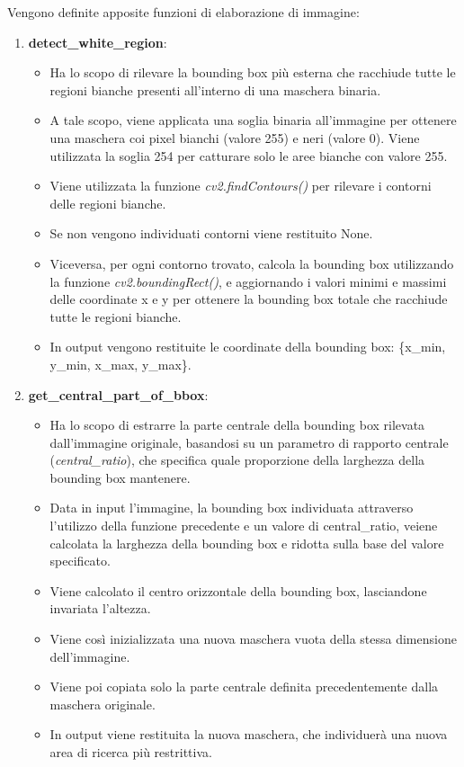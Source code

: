 \documentclass[12pt,a4paper,openright,twoside]{book}
\begin{document}
Vengono definite apposite funzioni di elaborazione di immagine:
\begin{enumerate}
\item \textbf{detect\_white\_region}:
\begin{itemize}
\item Ha lo scopo di rilevare la bounding box più esterna che racchiude tutte le regioni bianche presenti all'interno di una maschera binaria.
\item A tale scopo, viene applicata una soglia binaria all'immagine per ottenere una maschera coi pixel bianchi (valore 255) e neri (valore 0). Viene utilizzata la soglia 254 per catturare solo le aree bianche con valore 255.
\item Viene utilizzata la funzione {\itshape cv2.findContours()} per rilevare i contorni delle regioni bianche.
\item Se non vengono individuati contorni viene restituito None.
\item Viceversa, per ogni contorno trovato, calcola la bounding box utilizzando la funzione {\itshape cv2.boundingRect()}, e aggiornando i valori minimi e massimi delle coordinate x e y per ottenere la bounding box totale che racchiude tutte le regioni bianche.
\item In output vengono restituite le coordinate della bounding box: \{x\_min, y\_min, x\_max, y\_max\}.
\end{itemize}

\item \textbf{get\_central\_part\_of\_bbox}:
\begin{itemize}
\item Ha lo scopo di estrarre la parte centrale della bounding box rilevata dall'immagine originale, basandosi su un parametro di rapporto centrale ({\itshape central\_ratio}), che specifica quale proporzione della larghezza della bounding box mantenere.
\item Data in input l'immagine, la bounding box individuata attraverso l'utilizzo della funzione precedente e un valore di central\_ratio, veiene calcolata la larghezza della bounding box e ridotta sulla base del valore specificato. 
\item Viene calcolato il centro orizzontale della bounding box, lasciandone invariata l'altezza.
\item Viene così inizializzata una nuova maschera vuota della stessa dimensione dell'immagine.
\item Viene poi copiata solo la parte centrale definita precedentemente dalla maschera originale.
\item In output viene restituita la nuova maschera, che individuerà una nuova area di ricerca più restrittiva.
\end{itemize}


\end{enumerate}
\end{document}
